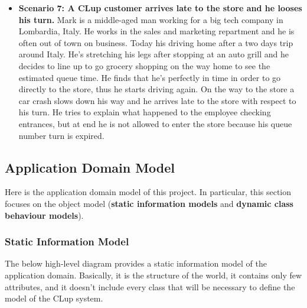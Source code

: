 \begin{itemize}
    \item \textbf{Scenario 7: A CLup customer arrives late to the store and he looses his turn.} Mark is a middle-aged man working for a big tech company in Lombardia, Italy. He works in the sales and marketing repartment and he is often out of town on business. Today his driving home after a two days trip around Italy. He's stretching his legs after stopping at an auto grill and he decides to line up to go grocery shopping on the way home to see the estimated queue time. He finds that he's perfectly in time in order to go directly to the store, thus he starts driving again. 
    On the way to the store a car crash slows down his way and he arrives late to the store with respect to his turn. He tries to explain what happened to the employee checking entrances, but at end he is not allowed to enter the store because his queue number turn is expired.
\end{itemize}

\subsection{Application Domain Model}
Here is the application domain model of this project. In particular, this section focuses on the object model (\textbf{static information models} and \textbf{dynamic class behaviour models}).
\subsubsection{Static Information Model}
The below high-level diagram provides a static information model of the application domain. Basically, it is the structure of the world, it contains only few attributes, and it doesn't include every class that will be necessary to define the model of the CLup system.

